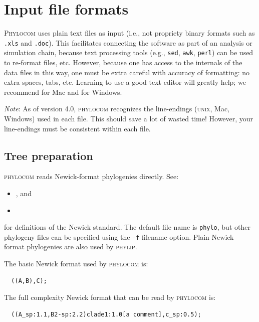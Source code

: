 \documentclass[12pt,letterpaper]{article}
\begin{document}
\section{Input file formats}

{\scshape Phylocom} uses plain text files as input (i.e., not propriety
binary formats such as \verb|.xls| and \verb|.doc|).  This facilitates
connecting the software as part of an analysis or simulation chain,
because text processing tools (e.g., \verb|sed|, \verb|awk|,
\verb|perl|) can be used to re-format files, etc.  However, because
one has access to the internals of the data files in this way, one
must be extra careful with accuracy of formatting: no extra spaces,
tabs, etc.  Learning to use a good text editor will greatly help; we
recommend
for Mac and
for Windows.

{\it Note}: As of version 4.0, {\scshape phylocom} recognizes the
line-endings (\textsc{unix}, Mac, Windows) used in each file.  This
should save a lot of wasted time!  However, your line-endings must be
consistent within each file.

\subsection{Tree preparation}

{\scshape phylocom} reads Newick-format phylogenies directly. See:
\begin{itemize}
\item[]
  ,
  and
\item[]
\end{itemize}
for definitions of the Newick standard.  The default file name is
\verb|phylo|, but other phylogeny files can be specified using the
\verb|-f| filename option.  Plain Newick format phylogenies are also
used by {\scshape phylip}.

The basic Newick format used by {\scshape phylocom} is:
\begin{verbatim}
  ((A,B),C);
\end{verbatim}
The full complexity Newick format that can be read by {\scshape phylocom} is:
\begin{verbatim}
  ((A_sp:1.1,B2-sp:2.2)clade1:1.0[a comment],c_sp:0.5);
\end{verbatim}
\end{document}
